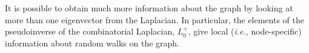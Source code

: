\documentclass[12pt]{article}
\theoremstyle{plain}
\begin{document}

It is possible to obtain much 
more information about the graph by looking at more than one eigenvector 
from the Laplacian.  
In particular, the elements of the pseudoinverse of the combinatorial Laplacian, 
$L_0^{+}$, give local (\emph{i.e.}, node-specific) information about random
walks on the graph.
\end{document}

